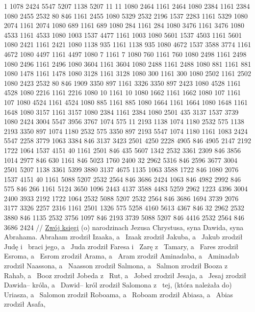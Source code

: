 \renewcommand{\chaptertitle}{}
\begingl
\lettrine[loversize=1,lraise=-1.3]{1 }{}%
 {} 1078 2424 5547 5207 1138 5207 11
{} 11 1080 2464 1161 2464 1080 2384 1161 2384 1080 2455 2532 80 846
{} 1161 2455 1080 5329 2532 2196 1537 2283 1161 5329 1080 2074 1161 2074 1080 689
{} 1161 689 1080 284 1161 284 1080 3476 1161 3476 1080 4533
{} 1161 4533 1080 1003 1537 4477 1161 1003 1080 5601 1537 4503 1161 5601 1080 2421
{} 1161 2421 1080 1138 935 1161 1138 935 1080 4672 1537 3588 {} 3774
{} 1161 4672 1080 4497 1161 4497 1080 7 1161 7 1080 760
{} 1161 760 1080 2498 1161 2498 1080 2496 1161 2496 1080 3604
{} 1161 3604 1080 2488 1161 2488 1080 881 1161 881 1080 1478
{} 1161 1478 1080 3128 1161 3128 1080 300 1161 300 1080 2502
{} 1161 2502 1080 2423 2532 80 846 1909 3350 {} 897
{} 1161 3326 3350 {} 897 2423 1080 4528 1161 4528 1080 2216
{} 1161 2216 1080 10 1161 10 1080 1662 1161 1662 1080 107
{} 1161 107 1080 4524 1161 4524 1080 885 1161 885 1080 1664
{} 1161 1664 1080 1648 1161 1648 1080 3157 1161 3157 1080 2384
{} 1161 2384 1080 2501 435 3137 1537 3739 1080 2424 3004 5547
{} 3956 3767 1074 575 11 2193 1138 1074 1180 2532 575 1138 2193 3350 {} 897 1074 1180 2532 575 3350 {} 897 2193 5547 1074 1180
{} 1161 1083 2424 5547 2258 3779 1063 3384 846 3137 3423 2501 4250 2228 4905 846 4905 2147 2192 {} 1722 1064 1537 4151 40
{} 1161 2501 846 435 5607 1342 2532 3361 2309 846 3856 1014 2977 846 630
{} 1161 {} 846 5023 1760 2400 32 2962 5316 846 2596 3677 3004 2501 5207 1138 3361 5399 3880 {} 3137 4675 1135 1063 3588 1722 846 1080 2076 1537 4151 40
{} 1161 5088 5207 2532 2564 846 3686 2424 1063 846 4982 2992 846 575 846 266
{} 1161 5124 3650 1096 2443 4137 3588 4483 5259 2962 1223 4396 3004
{} 2400 3933 2192 1722 1064 2532 5088 5207 2532 2564 846 3686 1694 3739 2076 3177 3326 2257 2316
{} 1161 2501 1326 575 5258 4160 5613 4367 846 32 2962 2532 3880 846 1135
{} 2532 3756 1097 846 2193 3739 5088 5207 846 4416 2532 2564 846 3686 2424
//
\glb
 \underline{Zwój księgi} (o) narodzinach Jezusa Chrystusa, syna Dawida, syna Abrahama.
 Abraham zrodził Izaaka, a~ Izaak zrodził Jakuba, a~ Jakub zrodził Judę i~ braci jego,
 a~ Juda zrodził Faresa i~ Zarę z~ Tamary, a~ Fares zrodził Esroma, a~ Esrom zrodził Arama,
 a~ Aram zrodził Aminadaba, a~ Aminadab zrodził Naassona, a~ Naasson zrodził Salmona,
 a~ Salmon zrodził Booza z~ Rahab, a~ Booz zrodził Jobeda z~ Rut, a~ Jobed zrodził Jesaja,
 a~ Jesaj zrodził Dawida– króla, a~ Dawid– król zrodził Salomona z~ tej, (która należała do) Uriasza,
 a~ Salomon zrodził Roboama, a~ Roboam zrodził Abiasa, a~ Abias zrodził Asafa,
